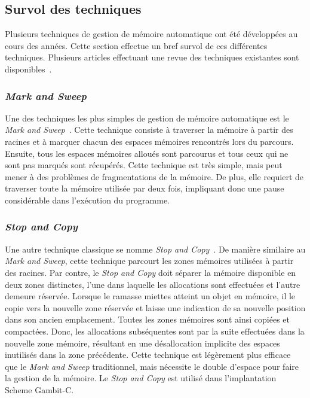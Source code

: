 \documentclass[12pt,twoside,letterpaper,francais]{book}
\begin{document}
\FloatBarrier
\subsection{Survol des techniques}
Plusieurs techniques de gestion de mémoire automatique ont été
développées au cours des années. Cette section effectue un bref survol
de ces différentes techniques. Plusieurs articles effectuant une revue
des techniques existantes sont
disponibles~\cite{GC_REVIEW1,GC_REVIEW3}.


\FloatBarrier
\subsubsection{\textit{Mark and Sweep}}
Une des techniques les plus simples de gestion de mémoire automatique
est le \textit{Mark and Sweep}~\cite{LISP_ORIGINS}. Cette technique
consiste à traverser la mémoire à partir des racines et à marquer
chacun des espaces mémoires rencontrés lors du parcours. Ensuite, tous
les espaces mémoires alloués sont parcourus et tous ceux qui ne sont
pas marqués sont récupérés. Cette technique est très simple, mais peut
mener à des problèmes de fragmentations de la mémoire. De plus, elle
requiert de traverser toute la mémoire utilisée par deux fois,
impliquant donc une pause considérable dans l'exécution du programme.


\FloatBarrier
\subsubsection{\textit{Stop and Copy}}
Une autre technique classique se nomme \textit{Stop and
  Copy}~\cite{STOP_AND_COPY}. De manière similaire au \textit{Mark and
  Sweep}, cette technique parcourt les zones mémoires utilisées à
partir des racines. Par contre, le \textit{Stop and Copy} doit séparer
la mémoire disponible en deux zones distinctes, l'une dans laquelle
les allocations sont effectuées et l'autre demeure réservée. Lorsque
le ramasse miettes atteint un objet en mémoire, il le copie vers la
nouvelle zone réservée et laisse une indication de sa nouvelle
position dans son ancien emplacement. Toutes les zones mémoires sont
ainsi copiées et compactées. Donc, les allocations subséquentes sont
par la suite effectuées dans la nouvelle zone mémoire, résultant en
une désallocation implicite des espaces inutilisés dans la zone
précédente. Cette technique est légèrement plus efficace que le
\textit{Mark and Sweep} traditionnel, mais nécessite le double
d'espace pour faire la gestion de la mémoire. Le \textit{Stop and
  Copy} est utilisé dans l'implantation Scheme Gambit-C.
\end{document}
